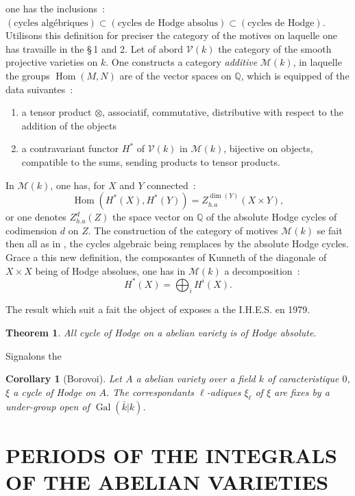 \documentclass[12pt,a4paper]{article}
\theoremstyle{plain}
\newtheorem{theorem}{Theorem}
\newtheorem{corollary}{Corollary}
\theoremstyle{definition}
\theoremstyle{remark}
\DeclareMathOperator{\Gal}{Gal}
\newcommand{\QQ}{\mathbb{Q}}
\providecommand{\QQ}{\mathbb{Q}}
\providecommand{\Hom}{\operatorname{Hom}}
\providecommand{\Gal}{\operatorname{Gal}}
\begin{document}
one has the inclusions~: $(\text{cycles algébriques}) \subset (\text{cycles de Hodge absolus}) \subset (\text{cycles de Hodge})$. Utilisons this definition for preciser the category of the motives on laquelle one has travaille in the \S\,1 and 2. Let of abord $\mathcal{V}(k)$ the category of the smooth projective varieties on $k$. One constructs a category \emph{additive} $\mathcal{M}(k)$, in laquelle the groups $\Hom(M,N)$ are of the vector spaces on $\QQ$, which is equipped of the data suivantes~:
\begin{enumerate}[label=\alph*)]
\item a tensor product $\otimes$, associatif, commutative, distributive with respect to the addition of the objects
\item a contravariant functor $H^*$ of $\mathcal{V}(k)$ in $\mathcal{M}(k)$, bijective on objects, compatible to the sums, sending products to tensor products.
\end{enumerate}
In $\mathcal{M}(k)$, one has, for $X$ and $Y$ connected~:
\[
\Hom(H^*(X), H^*(Y)) = Z^{\dim(Y)}_{h.a}(X \times Y),
\]
or one denotes $Z^d_{h.a}(Z)$ the space vector on $\QQ$ of the absolute Hodge cycles of codimension $d$ on $Z$. The construction of the category of motives $\mathcal{M}(k)$ se fait then all as in \cite{Demazure}, the cycles algebraic being remplaces by the absolute Hodge cycles. Grace a this new definition, the composantes of Kunneth of the diagonale of $X \times X$ being of Hodge absolues, one has in $\mathcal{M}(k)$ a decomposition~:
\[
H^*(X) = \bigoplus_i H^i(X).
\]

The result which suit a fait the object of exposes a the I.H.E.S. en 1979.

\begin{theorem}
All cycle of Hodge on a abelian variety is of Hodge absolute.
\end{theorem}

Signalons the

\begin{corollary}[Borovoi]
Let $A$ a abelian variety over a field $k$ of caracteristique $0$, $\xi$ a cycle of Hodge on $A$. The correspondants $\ell$-adiques $\xi_\ell$ of $\xi$ are fixes by a under-group open of $\Gal(\bar{k}|k)$.
\end{corollary}

\section{PERIODS OF THE INTEGRALS OF THE ABELIAN VARIETIES}
\end{document}
